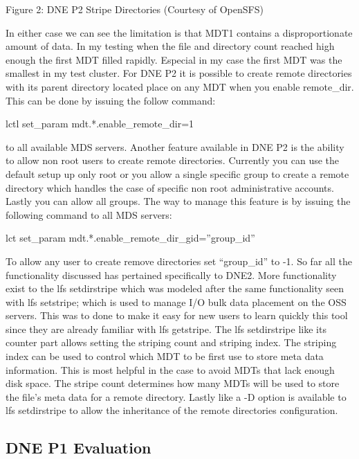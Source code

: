 \documentclass[conference,compsoc]{IEEEtran}
\begin{document}
Figure 2: DNE P2 Stripe Directories (Courtesy of OpenSFS)

In either case we can see the limitation is that MDT1 contains a
disproportionate amount of data. In my testing when the file and directory
count reached high enough the first MDT filled rapidly. Especial in my case the
first MDT was the smallest in my test cluster. For DNE P2 it is possible to
create remote directories with its parent directory located place on any MDT
when you enable remote_dir. This can be done by issuing the follow command:

lctl set_param mdt.*.enable_remote_dir=1

to all available MDS servers. Another feature available in DNE P2 is the
ability to allow non root users to create remote directories. Currently you can
use the default setup up only root or you allow a single specific group to
create a remote directory which handles the case of specific non root
administrative accounts. Lastly you can allow all groups. The way to manage
this feature is by issuing the following command to all MDS servers:

lct set_param mdt.*.enable_remote_dir_gid=”group_id” 

To allow any user to create remove directories set “group_id” to -1. So far all
the functionality discussed has pertained specifically to DNE2. More
functionality exist to the lfs setdirstripe which was modeled after the same
functionality seen with lfs setstripe; which is used to manage I/O bulk data
placement on the OSS servers. This was to done to make it easy for new users to
learn quickly this tool since they are already familiar with lfs getstripe. The
lfs setdirstripe like its counter part allows setting the striping count and
striping index. The striping index can be used to control which MDT to be first
use to store meta data information. This is most helpful in the case to avoid
MDTs that lack enough disk space. The stripe count determines how many MDTs
will be used to store the file’s meta data for a remote directory. Lastly like
a -D option is available to lfs setdirstripe to allow the inheritance of the
remote directories configuration.




\subsection{DNE P1 Evaluation}
\end{document}
